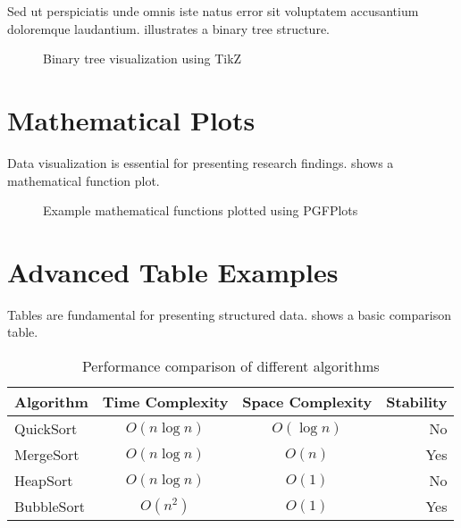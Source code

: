 Sed ut perspiciatis unde omnis iste natus error sit voluptatem accusantium doloremque laudantium.  illustrates a binary tree structure.

\begin{figure}[htbp]
\centering
{}
\caption{Binary tree visualization using TikZ}
\label{fig:tree}
\end{figure}

\section{Mathematical Plots}

Data visualization is essential for presenting research findings.  shows a mathematical function plot.

\begin{figure}[htbp]
\centering
{}
\caption{Example mathematical functions plotted using PGFPlots}
\label{fig:plot}
\end{figure}

\section{Advanced Table Examples}

Tables are fundamental for presenting structured data.  shows a basic comparison table.

\begin{table}[htbp]
\centering
\caption{Performance comparison of different algorithms}
\label{tab:simple}
\begin{tabular}{@{}lccr@{}}
\toprule
Algorithm & Time Complexity & Space Complexity & Stability \\
\midrule
QuickSort & $O(n \log n)$ & $O(\log n)$ & No \\
MergeSort & $O(n \log n)$ & $O(n)$ & Yes \\
HeapSort & $O(n \log n)$ & $O(1)$ & No \\
BubbleSort & $O(n^2)$ & $O(1)$ & Yes \\
\bottomrule
\end{tabular}
\end{table}


